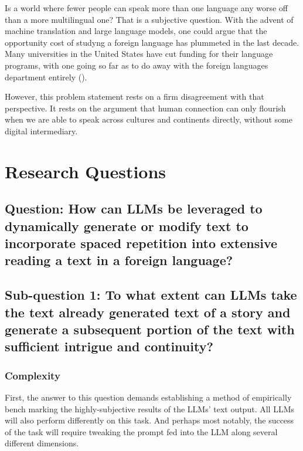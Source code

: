 \documentclass[
	letterpaper, %
]{jdf}
\newcommand{\pcite}[1]{(\cite{#1})}
\begin{document}
Is a world where fewer people can speak more than one language any worse off than a more multilingual one? That is a subjective question. With the advent of machine translation and large language models, one could argue that the opportunity cost of studyng a foreign language has plummeted in the last decade. Many universities in the United States have cut funding for their language programs, with one going so far as to do away with the foreign languages department entirely \pcite{wvmetronews2023}.

However, this problem statement rests on a firm disagreement with that perspective. It rests on the argument that human connection can only flourish when we are able to speak across cultures and continents directly, without some digital intermediary.

\section{Research Questions}

\subsection{Question: How can LLMs be leveraged to dynamically generate or modify text to incorporate spaced repetition into extensive reading a text in a foreign language?}

\subsection{Sub-question 1: To what extent can LLMs take the text already generated text of a story and generate a subsequent portion of the text with sufficient intrigue and continuity?}
\subsubsection{Complexity}
First, the answer to this question demands establishing a method of empirically bench marking the highly-subjective results of the LLMs' text output. All LLMs will also perform differently on this task. And perhaps most notably, the success of the task will require tweaking the prompt fed into the LLM along several different dimensions.
\end{document}
